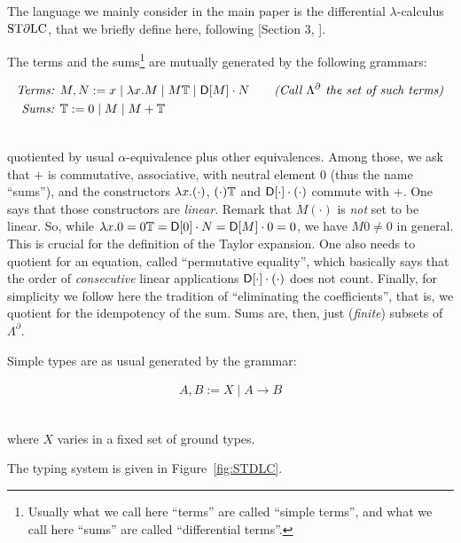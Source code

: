 The language we mainly consider in the main paper is the differential $\lambda$-calculus $\mathrm{ST}\partial\mathrm{LC}$, that we briefly define here, following [Section 3, \cite{Manzo2010}].

The terms and the sums\footnote{Usually what we call here ``terms'' are called ``simple terms'', and what we call here ``sums'' are called ``differential terms''.} are mutually generated by the following grammars:

{
\begin{minipage}{\textwidth}
\begin{align*}
\textit{Terms: } & M,N:= x\mid \lambda x.M \mid M\mathbb{T} \mid \mathsf{D} [M] \cdot N \qquad \textit{(Call $\Lambda^\partial$ the set of such terms)}
\\
\textit{Sums: } & \mathbb{T}:= 0 \mid M \mid M+\mathbb{T}
\end{align*}\end{minipage}}\medskip\\
quotiented by usual $\alpha$-equivalence plus other equivalences.
Among those, we ask that $+$ is commutative, associative, with neutral element $0$ (thus the name ``sums''), and the constructors $\lambda x.(\cdot)$, $(\cdot)\mathbb{T}$ and $\mathsf{D} [\cdot] \cdot (\cdot)$ commute with $+$.
One says that those constructors are \emph{linear}.
Remark that $M(\cdot)$ is \emph{not} set to be linear.
So, while $\lambda x.0=0\mathbb{T}=\mathsf{D} [0] \cdot N=\mathsf{D} [M] \cdot 0=0$, we have $M0\neq0$ in general.
This is crucial for the definition of the Taylor expansion.
One also needs to quotient for an equation, called ``permutative equality'', which basically says that the order of \emph{consecutive} linear applications $\mathsf{D} [\cdot] \cdot (\cdot)$ does not count.
Finally, for simplicity we follow here the tradition of ``eliminating the coefficients'', that is, we quotient for the idempotency of the sum.
Sums are, then, just (\emph{finite}) subsets of $\Lambda^\partial$.

Simple types are as usual generated by the grammar:

{
\begin{minipage}{\textwidth}
\begin{align*}
A,B:= X\mid A\to B
\end{align*}\end{minipage}}\medskip\\
where $X$ varies in a fixed set of ground types.

The typing system is given in Figure~\ref{fig:STDLC}.

